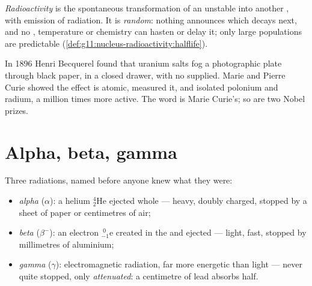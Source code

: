 \begin{definition}[Radioactivity]\label{def:g11:nucleus-radioactivity:radioactivity}
\emph{Radioactivity} is the spontaneous transformation
of an unstable  into another , with emission of radiation. It
is \emph{random}: nothing announces which  decays next, and no
, temperature or chemistry can hasten or delay it; only large
populations are predictable (\cref{def:g11:nucleus-radioactivity:halflife}).
\end{definition}

\begin{remark}\label{rem:g11:nucleus-radioactivity:curie}
In 1896 Henri Becquerel found that uranium salts fog a photographic plate
through black paper, in a closed drawer, with no  supplied. Marie and
Pierre Curie showed the effect is atomic, measured it, and isolated polonium
and radium, a million times more active. The word \emph{} is
Marie Curie's; so are two Nobel prizes.
\end{remark}

\section{Alpha, beta, gamma}

\begin{definition}\label{def:g11:nucleus-radioactivity:abg}
Three radiations, named before anyone knew what they were:
\begin{itemize}
  \item \emph{alpha} ($\alpha$): a helium 
        ${}^{4}_{2}\mathrm{He}$ ejected whole --- heavy, doubly charged,
        stopped by a sheet of paper or centimetres of air;
  \item \emph{beta} ($\beta^-$): an electron
        ${}^{\;0}_{-1}\mathrm{e}$ created in the  and ejected ---
        light, fast, stopped by millimetres of aluminium;
  \item \emph{gamma} ($\gamma$): electromagnetic
        radiation, far more energetic than light --- never quite stopped, only
        \emph{attenuated}: a centimetre of lead absorbs half.
\end{itemize}
\end{definition}

